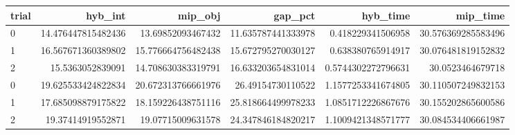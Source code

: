 \begin{tabular}{lrrrrr}
\hline
trial & hyb_int & mip_obj & gap_pct & hyb_time & mip_time \\ \hline
0 & 14.476447815482436 & 13.69852093467432 & 11.635787441333978 & 0.418229341506958 & 30.576369285583496 \\
1 & 16.567671360389802 & 15.776664756482438 & 15.672795270030127 & 0.638380765914917 & 30.076481819152832 \\
2 & 15.5363052839091 & 14.708630383319791 & 16.633203654831014 & 0.5744302272796631 & 30.0523464679718 \\
0 & 19.625533424822834 & 20.672313766661976 & 26.49154730110522 & 1.1577253341674805 & 30.110507249832153 \\
1 & 17.685098879175822 & 18.159226438751116 & 25.818664499978233 & 1.0851712226867676 & 30.155202865600586 \\
2 & 19.37414919552871 & 19.07715009631578 & 24.347846184820217 & 1.1009421348571777 & 30.084534406661987 \\
\hline
\end{tabular}

